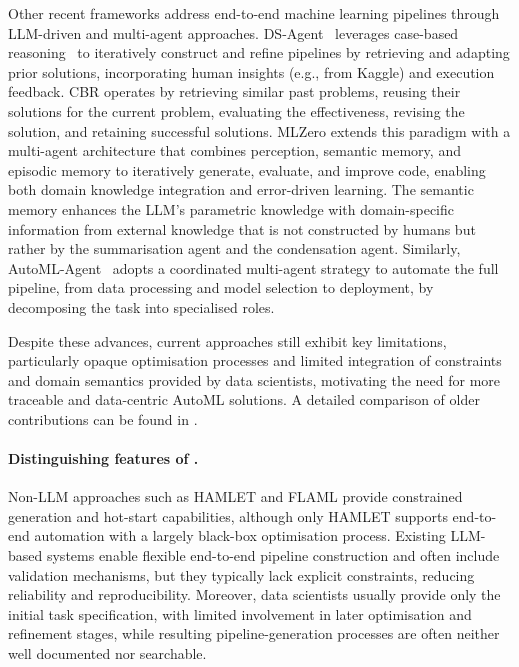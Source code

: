 \documentclass[runningheads]{llncs}
\begin{document}
Other recent frameworks address end-to-end machine learning pipelines through \ac{LLM}-driven and multi-agent approaches.
%
DS-Agent~\cite{DBLP:conf/icml/GuoD0C0024} leverages case-based reasoning~\cite{kolodner1992introduction}
to iteratively construct and refine pipelines by retrieving and adapting prior solutions,
incorporating human insights
(e.g., from Kaggle)
and execution feedback.
%
CBR operates by retrieving similar past problems,
reusing their solutions for the current problem,
evaluating the effectiveness,
revising the solution,
and
retaining successful solutions.
%
MLZero \cite{DBLP:journals/corr/abs-2505-13941} extends this paradigm with a multi-agent architecture
that combines perception, semantic memory, and episodic memory
to iteratively generate, evaluate, and improve code,
enabling both domain knowledge integration and error-driven learning.
%
The semantic memory enhances the \ac{LLM}'s parametric knowledge with domain-specific information
from external knowledge that is not constructed by humans but rather by the summarisation agent
and the condensation agent.
%
Similarly,
AutoML-Agent~\cite{DBLP:conf/icml/TriratJH25} adopts a coordinated multi-agent strategy to automate the full pipeline,
from data processing and model selection to deployment,
by decomposing the task into specialised roles.

Despite these advances,
current approaches still exhibit key limitations, 
particularly opaque optimisation processes and limited integration of constraints and domain semantics provided by data scientists,
motivating the need for more traceable and data-centric \ac{AutoML} solutions.
%
A detailed comparison of older contributions can be found in \cite{DBLP:conf/icml/TriratJH25}.

\paragraph{Distinguishing features of \ourapproach{}.}

% 

%
Non-\ac{LLM} approaches such as HAMLET and FLAML provide constrained generation and hot-start capabilities,
although only HAMLET supports end-to-end automation with a largely black-box optimisation process.
%
Existing \ac{LLM}-based systems enable flexible end-to-end pipeline construction and often include validation mechanisms,
but they typically lack explicit constraints, reducing reliability and reproducibility.
%
Moreover, 
data scientists usually provide only the initial task specification,
with limited involvement in later optimisation and refinement stages,
while resulting pipeline-generation processes are often neither well documented nor searchable.
\end{document}
